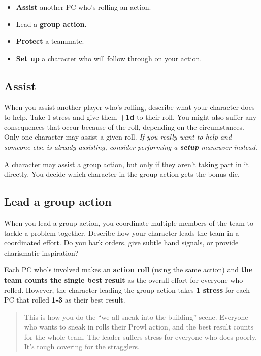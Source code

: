 \documentclass[11pt,oneside]{book}
\newcommand{\gameterm}[1]{\textbf{#1}}
\begin{document}
\begin{itemize}
	\item \textbf{Assist} another PC who’s rolling an action.
	\item Lead a \textbf{group action}.
	\item \textbf{Protect} a teammate.
	\item \textbf{Set up} a character who will follow through on your action.
\end{itemize}

\subsection{Assist}

When you assist another player who’s rolling, describe what your character does to help. Take 1 stress and give them \textbf{+1d} to their roll. You might also suffer any consequences that occur because of the roll, depending on the circumstances. Only one character may assist a given roll.\emph{ If you really want to help and someone else is already assisting, consider performing a \textbf{setup} maneuver instead.}

A character may assist a group action, but only if they aren’t taking part in it directly. You decide which character in the group action gets the bonus die.

\subsection{Lead a group action}

When you lead a group action, you coordinate multiple members of the team to tackle a problem together. Describe how your character leads the team in a coordinated effort. Do you bark orders, give subtle hand signals, or provide charismatic inspiration?

Each PC who’s involved makes an \textbf{action roll} (using the same action) and \textbf{the team counts the single best result} as the overall effort for everyone who rolled. However, the character leading the group action takes \textbf{1 stress} for each PC that rolled\gameterm{ 1-3}  as their best result.

\begin{quote}
	This is how you do the “we all sneak into the building” scene. Everyone who wants to sneak in rolls their Prowl action, and the best result counts for the whole team. The leader suffers stress for everyone who does poorly. It’s tough covering for the stragglers.
\end{quote} 
\end{document}
